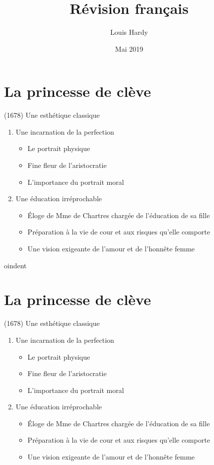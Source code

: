 \documentclass[12pt,a4paper]{article}
\title{Révision français}
\author{Louis Hardy}
\date{Mai 2019}
\begin{document}
\section*{La princesse de clève}
	(1678) Une esthétique classique
\begin{enumerate}
   \item Une incarnation de la perfection
   \begin{itemize}
     \item Le portrait physique
     \item Fine fleur de l'aristocratie
     \item L'importance du portrait moral
   \end{itemize}
   \item Une éducation irréprochable
   \begin{itemize}
       \item Éloge de Mme de Chartres chargée de l'éducation de sa fille
       \item Préparation à la vie de cour et aux risques qu'elle comporte
       \item Une vision exigeante de l'amour et de l'honnête femme
    \end{itemize}
\end{enumerate}

oindent\hrulefill

\section*{La princesse de clève}
	(1678) Une esthétique classique
\begin{enumerate}
   \item Une incarnation de la perfection
   \begin{itemize}
     \item Le portrait physique
     \item Fine fleur de l'aristocratie
     \item L'importance du portrait moral
   \end{itemize}
   \item Une éducation irréprochable
   \begin{itemize}
       \item Éloge de Mme de Chartres chargée de l'éducation de sa fille
       \item Préparation à la vie de cour et aux risques qu'elle comporte
       \item Une vision exigeante de l'amour et de l'honnête femme
    \end{itemize}
\end{enumerate}
\end{document}
